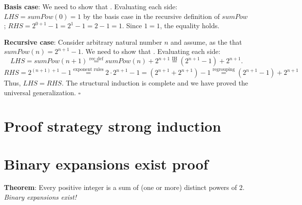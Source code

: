 \documentclass[12pt, oneside]{article}
\begin{document}
{\bf Basis case}: We need to show that \underline{}.
Evaluating each side: $LHS = sumPow(0) = 1$ by the basis case in the recursive definition
of $sumPow$; $RHS = 2^{0+1} - 1 = 2^1 - 1 = 2-1 = 1$. Since $1=1$, the equality holds.

{\bf Recursive case}: Consider arbitrary natural number $n$ and assume, as the 
\underline{\phantom{Induction Hypothesis (IH)}} that $sumPow(n) = 2^{n+1} - 1$. We need to show that
\underline{}.  Evaluating each side: 
\[
LHS = sumPow(n+1) \overset{\text{rec def}}{=} sumPow(n)  + 2^{n+1}\overset{\text{IH}}{=} (2^{n+1} - 1) + 2^{n+1}.
\]
\[
RHS = 2^{(n+1)+1}- 1 \overset{\text{exponent rules}}{=} 2 \cdot 2^{n+1} -1  = \left(2^{n+1} + 2^{n+1} \right) - 1
\overset{\text{regrouping}}{=}  (2^{n+1} - 1) + 2^{n+1} 
\]
Thus, $LHS = RHS$. The structural induction is complete and we have proved the universal generalization.
$\square$

 \vfill
\section*{Proof strategy strong induction}


 \vfill
\section*{Binary expansions exist proof}


{\bf Theorem}: Every positive integer is a sum of (one or more) distinct powers of $2$.
{\it Binary expansions exist!}
\end{document}
